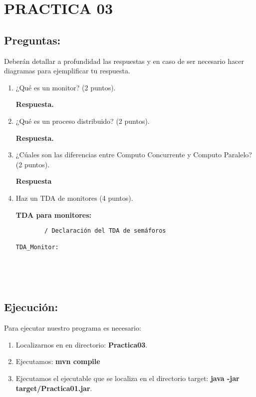 \documentclass[12pt]{article}
\begin{document}

{\color{red} \section*{\textbf{PRACTICA 03}}}
\vspace{1em}

{\color{blue} \subsection*{\textbf{Preguntas:}}}


Deberán detallar a profundidad las respuestas y en caso de ser necesario hacer diagramas 
para ejemplificar tu respuesta.\\


\begin{enumerate}
    \item ¿Qué es un monitor? (2 puntos).
    \vspace{2mm}
    
    \textbf{Respuesta.}
    \item ¿Qué es un proceso distribuido? (2 puntos).
    \vspace{2mm}
    
    \textbf{Respuesta.}
    \item ¿Cúales son las diferencias entre Computo Concurrente y Computo Paralelo? (2 puntos).
    \vspace{2mm}
    
    \textbf{Respuesta}
    \item Haz un TDA de monitores (4 puntos).
    \vspace{2mm}
    
    \textbf{TDA para monitores:}\\
    \begin{verbatim}
        / Declaración del TDA de semáforos
        
TDA_Monitor:

    
    \end{verbatim}\\
\end{enumerate}

{\color{blue} \subsection*{\textbf{Ejecución:}}}

Para ejecutar nuestro programa es necesario:\\

\begin{enumerate}
    \item Localizarnos en en directorio: \textbf{Practica03}.
    \item Ejecutamos: \textbf{mvn compile}
    \item Ejecutamos el ejecutable que se localiza en el directorio target: \textbf{java -jar target/Practica01.jar}. 
\end{enumerate}
\end{document}
